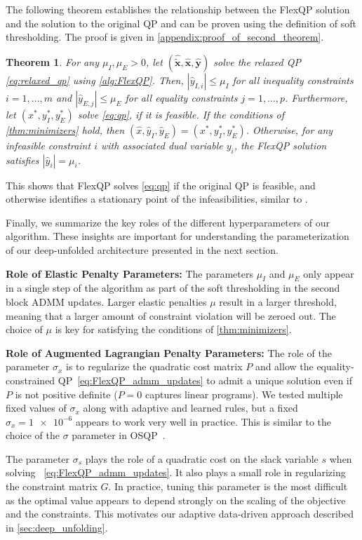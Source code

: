 \documentclass{article} %
\newtheorem{theorem}{Theorem}[section]
\begin{document}
The following theorem establishes the relationship between the FlexQP solution and the solution to the original QP and can be proven using the definition of soft thresholding. The proof is given in \cref{appendix:proof_of_second_theorem}.
\begin{theorem} \label{thm:FlexQP_solution}
For any $\mu_I, \mu_E > 0$, let $(\hat{\tilde{\boldsymbol{x}}}, \hat{\boldsymbol{x}}, \hat{\boldsymbol{y}})$ solve the relaxed QP \cref{eq:relaxed_qp} using \cref{alg:FlexQP}. Then, $|\hat{y}_{I, i}| \leq \mu_I$ for all inequality constraints $i = 1, \ldots, m$ and $|\hat{y}_{E, j}| \leq \mu_E$ for all equality constraints $j = 1, \ldots, p$. Furthermore, let $(x^*, y_I^*, y_E^*)$ solve \cref{eq:qp}, if it is feasible.  If the conditions of \cref{thm:minimizers} hold, then $(\hat{x}, \hat{y}_I, \hat{y}_E) = (x^*, y_I^*, y_E^*)$. Otherwise, for any infeasible constraint $i$ with associated dual variable $y_i$, the FlexQP solution satisfies $|\hat{y}_i| = \mu_i$.
\end{theorem}
This shows that FlexQP solves \cref{eq:qp} if the original QP is feasible, and otherwise identifies a stationary point of the infeasibilities, similar to \citet[Theorem 17.4]{nocedal2006numerical}.

Finally, we summarize the key roles of the different hyperparameters of our algorithm. These insights are important for understanding the parameterization of our deep-unfolded architecture presented in the next section.

\textbf{Role of Elastic Penalty Parameters:} The parameters $\mu_I$ and $\mu_E$ only appear in a single step of the algorithm as part of the soft thresholding in the second block ADMM updates. Larger elastic penalties $\mu$ result in a larger threshold, meaning that a larger amount of constraint violation will be zeroed out. The choice of $\mu$ is key for satisfying the conditions of \cref{thm:minimizers}.

\textbf{Role of Augmented Lagrangian Penalty Parameters:} The role of the parameter $\sigma_x$ is to regularize the quadratic cost matrix $P$ and allow the equality-constrained QP~\cref{eq:FlexQP_admm_updates} to admit a unique solution even if $P$ is not positive definite ($P = 0$ captures linear programs). We tested multiple fixed values of $\sigma_x$ along with adaptive and learned rules, but a fixed $\sigma_x = \num{1e-6}$ appears to work very well in practice. This is similar to the choice of the $\sigma$ parameter in OSQP~\citep{stellato2020osqp}.

The parameter $\sigma_s$ plays the role of a quadratic cost on the slack variable $s$ when solving~ \cref{eq:FlexQP_admm_updates}. It also plays a small role in regularizing the constraint matrix $G$. In practice, tuning this parameter is the most difficult as the optimal value appears to depend strongly on the scaling of the objective and the constraints. This motivates our adaptive data-driven approach described in \cref{sec:deep_unfolding}.
\end{document}
